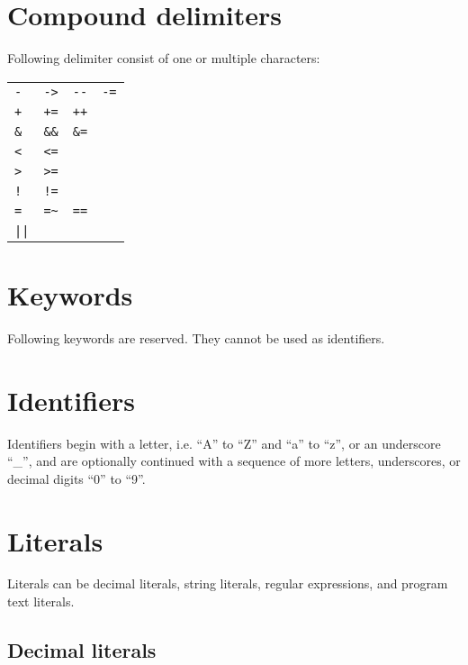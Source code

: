 \section{Compound delimiters}

Following delimiter consist of one or multiple characters:

\bigskip
\noindent
\begin{tabular}{l l l l}
   \lstinline!-! & \lstinline!->! & \lstinline!--! & \lstinline!-=! \\
   \lstinline!+! & \lstinline!+=! & \lstinline!++! \\
   \lstinline!&! & \lstinline!&&! & \lstinline!&=! \\
   \lstinline!<! & \lstinline!<=! \\
   \lstinline!>! & \lstinline!>=! \\
   \lstinline/!/ & \lstinline/!=/ \\
   \lstinline!=! & \lstinline!=~! & \lstinline!==! \\
   \lstinline!||! \\
\end{tabular}

\section{Keywords}

Following keywords are reserved. They cannot be used as identifiers.

\bigskip
\noindent


\section{Identifiers}\label{identifier}

Identifiers begin with a letter, i.e. ``A'' to ``Z'' and ``a'' to ``z'',
or an underscore ``\_'', and are optionally continued with a sequence
of more letters, underscores, or decimal digits ``0'' to ``9''.

\section{Literals}

Literals can be decimal literals, string literals, regular expressions,
and program text literals.

\subsection{Decimal literals}

